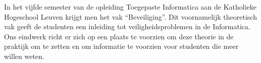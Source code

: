In het vijfde semester van de opleiding Toegepaste Informatica aan de Katholieke Hogeschool Leuven krijgt men het vak ``Beveiliging''. Dit voornamelijk theoretisch vak geeft de studenten een inleiding tot veiligheidsproblemen in de Informatica. Ons eindwerk richt er zich op een plaats te voorzien om deze theorie in de praktijk om te zetten en om informatie te voorzien voor studenten die meer willen weten.
